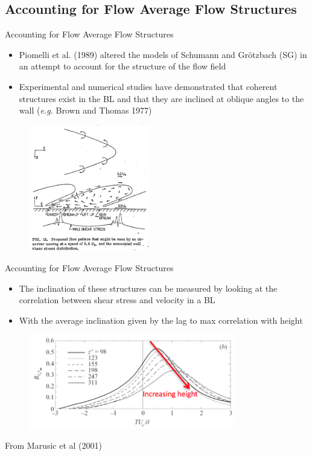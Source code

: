 \subsection{Accounting for Flow Average Flow Structures} %
\begin{frame}{Accounting for Flow Average Flow Structures}
\begin{itemize}
	\item Piomelli et al. (1989) altered the models of Schumann and Gr{\"o}tzbach (SG) in an attempt to account for the structure of the flow field
	\item Experimental and numerical studies have demonstrated that coherent structures exist in the BL and that they are inclined at oblique angles to the wall (\textit{e.g.} Brown and Thomas 1977)
\end{itemize}
\vspace{-10pt}
\begin{figure}
	\includegraphics[width=0.47\textwidth]{sbc3}
\end{figure}
\end{frame}
\begin{frame}{Accounting for Flow Average Flow Structures}
\begin{itemize}
	\item The inclination of these structures can be measured by looking at the correlation between shear stress and velocity in a BL
	\item With the average inclination given by the lag to max correlation with height
\end{itemize}
\begin{figure}
	\includegraphics[width=0.8\textwidth]{sbc4}
\end{figure}
\centering From Marusic et al (2001)
\end{frame}
